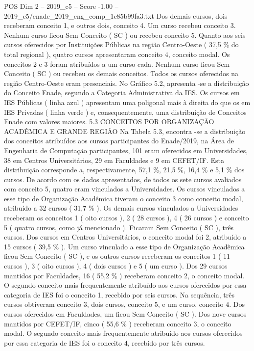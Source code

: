 \begin{textsample}{POS Dim 2 – 2019\_c5 – Score -1.00 – 2019\_c5/enade\_2019\_eng\_comp\_1c85b99fa3.txt}
Dos demais cursos, dois receberam conceito 1, e outros dois, conceito 4.
Um curso recebeu conceito 3.
Nenhum curso ficou Sem Conceito ( SC ) ou recebeu conceito 5.
Quanto aos seis cursos oferecidos por Instituições Públicas na região Centro-Oeste ( 37,5 \% do total regional ), quatro cursos apresentaram conceito 4, conceito modal.
Os conceitos 2 e 3 foram atribuídos a um curso cada.
Nenhum curso ficou Sem Conceito ( SC ) ou recebeu os demais conceitos.
Todos os cursos oferecidos na região Centro-Oeste eram presenciais.
No Gráfico 5.2, apresenta -se a distribuição do Conceito Enade, segundo a Categoria Administrativa da IES.
Os cursos em IES Públicas ( linha azul ) apresentam uma poligonal mais à direita do que os em IES Privadas ( linha verde ) e, consequentemente, uma distribuição de Conceitos Enade com valores maiores. 5.3 CONCEITOS POR ORGANIZAÇÃO ACADÊMICA E GRANDE REGIÃO Na Tabela 5.3, encontra -se a distribuição dos conceitos atribuídos aos cursos participantes do Enade/2019, na Área de Engenharia de Computação participantes, 101 eram oferecidos em Universidades, 38 em Centros Universitários, 29 em Faculdades e 9 em CEFET/IF.
Esta distribuição corresponde a, respectivamente, 57,1 \%, 21,5 \%, 16,4 \% e 5,1 \% dos cursos.
De acordo com os dados apresentados, de todos os sete cursos avaliados com conceito 5, quatro eram vinculados a Universidades.
Os cursos vinculados a esse tipo de Organização Acadêmica tiveram o conceito 3 como conceito modal, atribuído a 32 cursos ( 31,7 \% ).
Os demais cursos vinculados a Universidades receberam os conceitos 1 ( oito cursos ), 2 ( 28 cursos ), 4 ( 26 cursos ) e conceito 5 ( quatro cursos, como já mencionado ).
Ficaram Sem Conceito ( SC ), três cursos.
Dos cursos em Centros Universitários, o conceito modal foi 2, atribuído a 15 cursos ( 39,5 \% ).
Um curso vinculado a esse tipo de Organização Acadêmica ficou Sem Conceito ( SC ), e os outros cursos receberam os conceitos 1 ( 11 cursos ), 3 ( oito cursos ), 4 ( dois cursos ) e 5 ( um curso ).
Dos 29 cursos mantidos por Faculdades, 16 ( 55,2 \% ) receberam conceito 2, o conceito modal.
O segundo conceito mais frequentemente atribuído aos cursos oferecidos por essa categoria de IES foi o conceito 1, recebido por seis cursos.
Na sequência, três cursos obtiveram conceito 3, dois cursos, conceito 5, e um curso, conceito 4.
Dos cursos oferecidos em Faculdades, um ficou Sem Conceito ( SC ).
Dos nove cursos mantidos por CEFET/IF, cinco ( 55,6 \% ) receberam conceito 3, o conceito modal.
O segundo conceito mais frequentemente atribuído aos cursos oferecidos por essa categoria de IES foi o conceito 4, recebido por três cursos.

\end{textsample}
